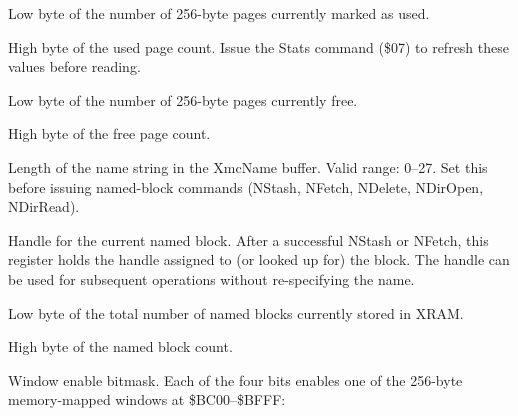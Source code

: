 
Low byte of the number of 256-byte pages currently marked as used.


High byte of the used page count.  Issue the Stats command (\$07) to
refresh these values before reading.



Low byte of the number of 256-byte pages currently free.


High byte of the free page count.



Length of the name string in the XmcName buffer.  Valid range: 0--27.  Set
this before issuing named-block commands (NStash, NFetch, NDelete,
NDirOpen, NDirRead).



Handle for the current named block.  After a successful NStash or NFetch,
this register holds the handle assigned to (or looked up for) the block.
The handle can be used for subsequent operations without re-specifying the
name.



Low byte of the total number of named blocks currently stored in XRAM.


High byte of the named block count.



Window enable bitmask.  Each of the four bits enables one of the 256-byte
memory-mapped windows at \$BC00--\$BFFF:


